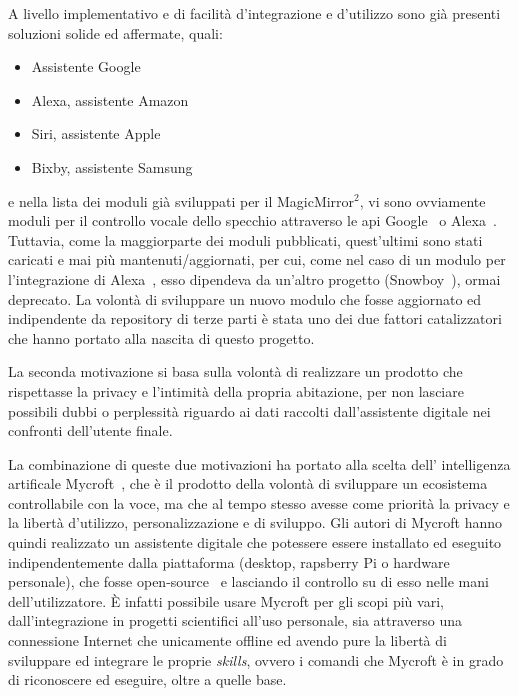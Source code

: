 \documentclass[12pt,a4paper]{article}
\begin{document}
A livello implementativo e di facilit\`a d'integrazione e d'utilizzo sono gi\`a presenti soluzioni solide ed affermate,
quali:
\begin{itemize}
  \item Assistente Google
  \item Alexa, assistente Amazon
  \item Siri, assistente Apple
  \item Bixby, assistente Samsung
\end{itemize}
e nella lista dei moduli gi\`a sviluppati per il MagicMirror$^2$, vi sono ovviamente moduli per il controllo vocale
dello specchio attraverso le api Google~\cite{GoogleAssistant} o Alexa~\cite{AlexaAssistant}. Tuttavia, come la
maggiorparte dei moduli pubblicati, quest'ultimi sono stati caricati e mai pi\`u mantenuti/aggiornati, per cui, come
nel caso di un modulo per l'integrazione di Alexa~\cite{AlexaBrokenModule}, esso dipendeva da un'altro progetto
(Snowboy~\cite{Snowboy}), ormai deprecato. La volont\`a di sviluppare un nuovo modulo che fosse aggiornato ed
indipendente da repository di terze parti \`e stata uno dei due fattori catalizzatori che hanno portato alla nascita
di questo progetto.

La seconda motivazione si basa sulla volont\`a di realizzare un prodotto che rispettasse la privacy e l'intimit\`a
della propria abitazione, per non lasciare possibili dubbi o perplessit\`a riguardo ai dati raccolti dall'assistente
digitale nei confronti dell'utente finale.

La combinazione di queste due motivazioni ha portato alla scelta dell' intelligenza artificale Mycroft~\cite{MycroftSite},
che \`e il prodotto della volont\`a di sviluppare un ecosistema controllabile con la voce, ma che al tempo stesso
avesse come priorit\`a la privacy e la libert\`a d'utilizzo, personalizzazione e di sviluppo. Gli autori di Mycroft
hanno quindi realizzato un assistente digitale che potessere essere installato ed eseguito indipendentemente dalla
piattaforma (desktop, rapsberry Pi o hardware personale), che fosse open-source~\cite{MycroftRepo} e lasciando il
controllo su di esso nelle mani dell'utilizzatore. \`E infatti possibile usare Mycroft per gli scopi pi\`u vari,
dall'integrazione in progetti scientifici all'uso personale, sia attraverso una connessione Internet che unicamente
offline ed avendo pure la libert\`a di sviluppare ed integrare le proprie \textit{skills}, ovvero i comandi che
Mycroft \`e in grado di riconoscere ed eseguire, oltre a quelle base.
\end{document}
